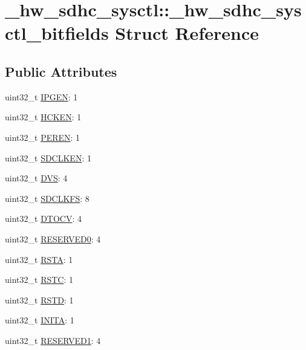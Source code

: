 \hypertarget{struct__hw__sdhc__sysctl_1_1__hw__sdhc__sysctl__bitfields}{}\section{\+\_\+hw\+\_\+sdhc\+\_\+sysctl\+:\+:\+\_\+hw\+\_\+sdhc\+\_\+sysctl\+\_\+bitfields Struct Reference}
\label{struct__hw__sdhc__sysctl_1_1__hw__sdhc__sysctl__bitfields}
\subsection*{Public Attributes}
\begin{DoxyCompactItemize}
\item 
uint32\+\_\+t \hyperlink{struct__hw__sdhc__sysctl_1_1__hw__sdhc__sysctl__bitfields_a62596b8f254d4c7f6a4949fce9bb9916}{I\+P\+G\+EN}\+: 1
\item 
uint32\+\_\+t \hyperlink{struct__hw__sdhc__sysctl_1_1__hw__sdhc__sysctl__bitfields_a5783e070e72b4a23daea72b7806a9329}{H\+C\+K\+EN}\+: 1
\item 
uint32\+\_\+t \hyperlink{struct__hw__sdhc__sysctl_1_1__hw__sdhc__sysctl__bitfields_a9858cf4afe74e78fd9128b7d9234e634}{P\+E\+R\+EN}\+: 1
\item 
uint32\+\_\+t \hyperlink{struct__hw__sdhc__sysctl_1_1__hw__sdhc__sysctl__bitfields_ac02abd7ee6d35d40c47e1d3676c2c969}{S\+D\+C\+L\+K\+EN}\+: 1
\item 
uint32\+\_\+t \hyperlink{struct__hw__sdhc__sysctl_1_1__hw__sdhc__sysctl__bitfields_ab6e509034c8f7d81d6f2026f9cd65828}{D\+VS}\+: 4
\item 
uint32\+\_\+t \hyperlink{struct__hw__sdhc__sysctl_1_1__hw__sdhc__sysctl__bitfields_a03c62dee21be12a9aec6807b4bd8a0c5}{S\+D\+C\+L\+K\+FS}\+: 8
\item 
uint32\+\_\+t \hyperlink{struct__hw__sdhc__sysctl_1_1__hw__sdhc__sysctl__bitfields_adfc79137ab9f5e2cf2f1e349f175546d}{D\+T\+O\+CV}\+: 4
\item 
uint32\+\_\+t \hyperlink{struct__hw__sdhc__sysctl_1_1__hw__sdhc__sysctl__bitfields_a0d73d66ddfae2b37f0398a6e4ad51c43}{R\+E\+S\+E\+R\+V\+E\+D0}\+: 4
\item 
uint32\+\_\+t \hyperlink{struct__hw__sdhc__sysctl_1_1__hw__sdhc__sysctl__bitfields_a677c1d845f6928f23dbeaf40aecaffad}{R\+S\+TA}\+: 1
\item 
uint32\+\_\+t \hyperlink{struct__hw__sdhc__sysctl_1_1__hw__sdhc__sysctl__bitfields_a33f1d2ee8fb3057f47525f6b3b406a86}{R\+S\+TC}\+: 1
\item 
uint32\+\_\+t \hyperlink{struct__hw__sdhc__sysctl_1_1__hw__sdhc__sysctl__bitfields_a59fff32d0c7195f5f950e40ac61f68c1}{R\+S\+TD}\+: 1
\item 
uint32\+\_\+t \hyperlink{struct__hw__sdhc__sysctl_1_1__hw__sdhc__sysctl__bitfields_ad4d8048e0285ab065828d9ecdb12b40b}{I\+N\+I\+TA}\+: 1
\item 
uint32\+\_\+t \hyperlink{struct__hw__sdhc__sysctl_1_1__hw__sdhc__sysctl__bitfields_a456c5c5790fa25df4a5aa0afc54443ac}{R\+E\+S\+E\+R\+V\+E\+D1}\+: 4
\end{DoxyCompactItemize}



